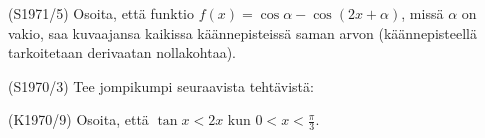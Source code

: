 \begin{tehtava} (S1971/5)
	Osoita, että funktio $f(x)=\cos\alpha-\cos(2x+\alpha)$, missä $\alpha$ on vakio, saa kuvaajansa kaikissa käännepisteissä 
	saman arvon (käännepisteellä tarkoitetaan derivaatan nollakohtaa).
\end{tehtava}

\begin{tehtava} (S1970/3)
	Tee jompikumpi seuraavista tehtävistä:
\end{tehtava}

\begin{tehtava} (K1970/9)
	Osoita, että $\tan x<2x$ kun $0<x<\frac{\pi}{3}$.
\end{tehtava}
